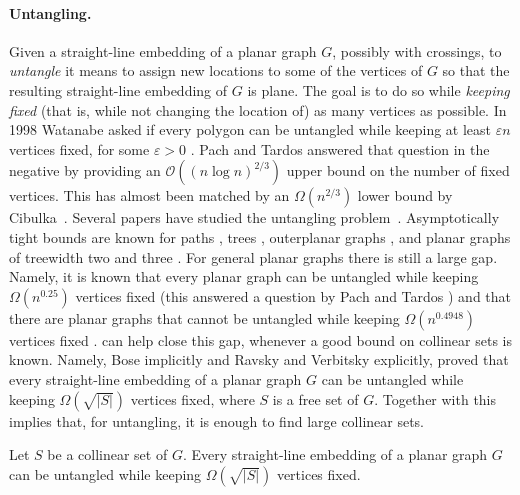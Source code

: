 \paragraph{Untangling.}  Given a straight-line embedding of a planar
graph $G$, possibly with crossings, to \emph{untangle} it means to assign
new locations to some of the vertices of $G$ so that the resulting
straight-line embedding of $G$ is plane. The goal is to do so while
\emph{keeping fixed} (that is, while not changing the location of) as many vertices as possible. In 1998 Watanabe asked if every polygon can be untangled while keeping at least $\varepsilon n$ vertices
fixed, for some $\varepsilon >0$ . Pach and Tardos\cite{pt-up-02} answered that question in
the negative by providing an $\mathcal{O}((n\log n)^{2/3})$ upper bound on the
number of fixed vertices. This has almost been  matched by
an 
$\Omega(n^{2/3})$ lower bound by Cibulka~\cite{c-upg-10}. Several papers have studied the untangling
problem~\cite{pt-up-02,cano.toth.ea:upper,c-upg-10,bose.dujmovic.ea:polynomial,gkossw-upg-09, kpr-upg-11,ravsky.verbitsky:on}. Asymptotically tight
bounds are known for paths \cite{c-upg-10}, trees \cite{gkossw-upg-09}, outerplanar graphs
\cite{gkossw-upg-09}, and planar graphs of treewidth two and three \cite{ravsky.verbitsky:on,
  dalozzo.dujmovic.ea:drawing}. For general
planar graphs there is still a large gap. Namely, it is known that every planar graph can be untangled while
keeping $\Omega(n^{0.25})$ vertices fixed
\cite{bose.dujmovic.ea:polynomial} (this answered a 
question by Pach and Tardos \cite{pt-up-02})  and that there are planar graphs
that cannot be untangled while keeping $\Omega(n^{0.4948})$ vertices
fixed \cite{cano.toth.ea:upper}.  can help close this gap, whenever a good bound
on collinear sets is known.  %
Namely, Bose \etal\cite{bose.dujmovic.ea:polynomial} implicitly and  Ravsky and Verbitsky
\cite{ravsky.verbitsky:on} explicitly, proved that every straight-line
embedding of a planar graph $G$ can be untangled while keeping
$\Omega(\sqrt{|S|})$ vertices fixed, where $S$ is a free set of
$G$. Together with  this implies that, for untangling, it is enough to
find large collinear sets.

\begin{thm}
Let $S$ be a collinear set of $G$. Every straight-line embedding of a
planar graph $G$ can be untangled while keeping $\Omega(\sqrt{|S|})$ vertices fixed.
\end{thm}

